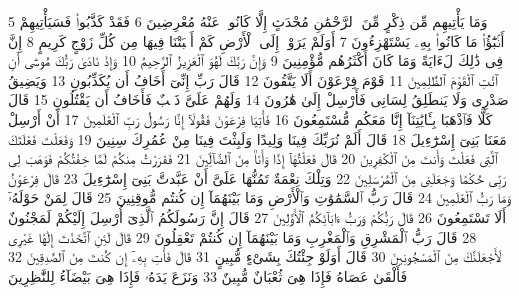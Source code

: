 {\tiny\colorbox{cl_aya}{5}} وَمَا يَأْتِيهِم مِّن ذِكْرٍ مِّنَ ٱلرَّحْمَٰنِ مُحْدَثٍ إِلَّا كَانُوا۟ عَنْهُ مُعْرِضِينَ
{\tiny\colorbox{cl_aya}{6}} فَقَدْ كَذَّبُوا۟ فَسَيَأْتِيهِمْ أَنۢبَٰٓؤُا۟ مَا كَانُوا۟ بِهِۦ يَسْتَهْزِءُونَ
{\tiny\colorbox{cl_aya}{7}} أَوَلَمْ يَرَوْا۟ إِلَى ٱلْأَرْضِ كَمْ أَنۢبَتْنَا فِيهَا مِن كُلِّ زَوْجٍ كَرِيمٍ
{\tiny\colorbox{cl_aya}{8}} إِنَّ فِى ذَٰلِكَ لَءَايَةً وَمَا كَانَ أَكْثَرُهُم مُّؤْمِنِينَ
{\tiny\colorbox{cl_aya}{9}} وَإِنَّ رَبَّكَ لَهُوَ ٱلْعَزِيزُ ٱلرَّحِيمُ
{\tiny\colorbox{cl_aya}{10}} وَإِذْ نَادَىٰ رَبُّكَ مُوسَىٰٓ أَنِ ٱئْتِ ٱلْقَوْمَ ٱلظَّٰلِمِينَ
{\tiny\colorbox{cl_aya}{11}} قَوْمَ فِرْعَوْنَ أَلَا يَتَّقُونَ
{\tiny\colorbox{cl_aya}{12}} قَالَ رَبِّ إِنِّىٓ أَخَافُ أَن يُكَذِّبُونِ
{\tiny\colorbox{cl_aya}{13}} وَيَضِيقُ صَدْرِى وَلَا يَنطَلِقُ لِسَانِى فَأَرْسِلْ إِلَىٰ هَٰرُونَ
{\tiny\colorbox{cl_aya}{14}} وَلَهُمْ عَلَىَّ ذَنۢبٌ فَأَخَافُ أَن يَقْتُلُونِ
{\tiny\colorbox{cl_aya}{15}} قَالَ كَلَّا فَٱذْهَبَا بِـَٔايَٰتِنَآ إِنَّا مَعَكُم مُّسْتَمِعُونَ
{\tiny\colorbox{cl_aya}{16}} فَأْتِيَا فِرْعَوْنَ فَقُولَآ إِنَّا رَسُولُ رَبِّ ٱلْعَٰلَمِينَ
{\tiny\colorbox{cl_aya}{17}} أَنْ أَرْسِلْ مَعَنَا بَنِىٓ إِسْرَٰٓءِيلَ
{\tiny\colorbox{cl_aya}{18}} قَالَ أَلَمْ نُرَبِّكَ فِينَا وَلِيدًا وَلَبِثْتَ فِينَا مِنْ عُمُرِكَ سِنِينَ
{\tiny\colorbox{cl_aya}{19}} وَفَعَلْتَ فَعْلَتَكَ ٱلَّتِى فَعَلْتَ وَأَنتَ مِنَ ٱلْكَٰفِرِينَ
{\tiny\colorbox{cl_aya}{20}} قَالَ فَعَلْتُهَآ إِذًا وَأَنَا۠ مِنَ ٱلضَّآلِّينَ
{\tiny\colorbox{cl_aya}{21}} فَفَرَرْتُ مِنكُمْ لَمَّا خِفْتُكُمْ فَوَهَبَ لِى رَبِّى حُكْمًا وَجَعَلَنِى مِنَ ٱلْمُرْسَلِينَ
{\tiny\colorbox{cl_aya}{22}} وَتِلْكَ نِعْمَةٌ تَمُنُّهَا عَلَىَّ أَنْ عَبَّدتَّ بَنِىٓ إِسْرَٰٓءِيلَ
{\tiny\colorbox{cl_aya}{23}} قَالَ فِرْعَوْنُ وَمَا رَبُّ ٱلْعَٰلَمِينَ
{\tiny\colorbox{cl_aya}{24}} قَالَ رَبُّ ٱلسَّمَٰوَٰتِ وَٱلْأَرْضِ وَمَا بَيْنَهُمَآ إِن كُنتُم مُّوقِنِينَ
{\tiny\colorbox{cl_aya}{25}} قَالَ لِمَنْ حَوْلَهُۥٓ أَلَا تَسْتَمِعُونَ
{\tiny\colorbox{cl_aya}{26}} قَالَ رَبُّكُمْ وَرَبُّ ءَابَآئِكُمُ ٱلْأَوَّلِينَ
{\tiny\colorbox{cl_aya}{27}} قَالَ إِنَّ رَسُولَكُمُ ٱلَّذِىٓ أُرْسِلَ إِلَيْكُمْ لَمَجْنُونٌ
{\tiny\colorbox{cl_aya}{28}} قَالَ رَبُّ ٱلْمَشْرِقِ وَٱلْمَغْرِبِ وَمَا بَيْنَهُمَآ إِن كُنتُمْ تَعْقِلُونَ
{\tiny\colorbox{cl_aya}{29}} قَالَ لَئِنِ ٱتَّخَذْتَ إِلَٰهًا غَيْرِى لَأَجْعَلَنَّكَ مِنَ ٱلْمَسْجُونِينَ
{\tiny\colorbox{cl_aya}{30}} قَالَ أَوَلَوْ جِئْتُكَ بِشَىْءٍ مُّبِينٍ
{\tiny\colorbox{cl_aya}{31}} قَالَ فَأْتِ بِهِۦٓ إِن كُنتَ مِنَ ٱلصَّٰدِقِينَ
{\tiny\colorbox{cl_aya}{32}} فَأَلْقَىٰ عَصَاهُ فَإِذَا هِىَ ثُعْبَانٌ مُّبِينٌ
{\tiny\colorbox{cl_aya}{33}} وَنَزَعَ يَدَهُۥ فَإِذَا هِىَ بَيْضَآءُ لِلنَّٰظِرِينَ
